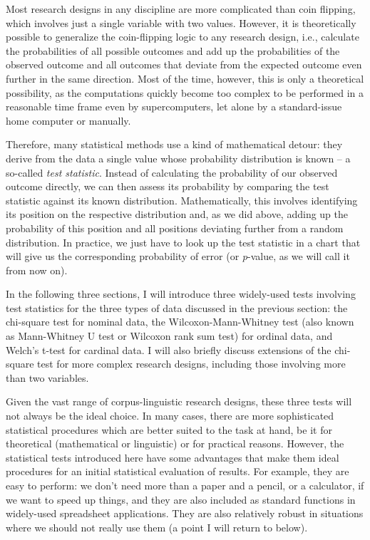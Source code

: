 Most research designs in any discipline are more complicated than coin flipping, which involves just a single variable with two values. However, it is theoretically possible to generalize the coin-flipping logic to any research design, i.e., calculate the probabilities of all possible outcomes and add up the probabilities of the observed outcome and all outcomes that deviate from the expected outcome even further in the same direction. Most of the time, however, this is only a theoretical possibility, as the computations quickly become too complex to be performed in a reasonable time frame even by supercomputers, let alone by a standard-issue home computer or manually.

Therefore, many statistical methods use a kind of mathematical detour: they derive from the data a single value whose probability distribution is known -- a so-called \textit{test statistic}. Instead of calculating the probability of our observed outcome directly, we can then assess its probability by comparing the test statistic against its known distribution. Mathematically, this involves identifying its position on the respective distribution and, as we did above, adding up the probability of this position and all positions deviating further from a random distribution. In practice, we just have to look up the test statistic in a chart that will give us the corresponding probability of error (or \textit{p}-value, as we will call it from now on).

In the following three sections, I will introduce three widely-used tests involving test statistics for the three types of data discussed in the previous section: the chi-square test for nominal data, the Wilcoxon-Mann-Whitney test (also known as Mann-Whitney U test or Wilcoxon rank sum test) for ordinal data, and Welch's t-test for cardinal data. I will also briefly discuss extensions of the chi-square test for more complex research designs, including those involving more than two variables.

Given the vast range of corpus-linguistic research designs, these three tests will not always be the ideal choice. In many cases, there are more sophisticated statistical procedures which are better suited to the task at hand, be it for theoretical (mathematical or linguistic) or for practical reasons. However, the statistical tests introduced here have some advantages that make them ideal procedures for an initial statistical evaluation of results. For example, they are easy to perform: we don't need more than a paper and a pencil, or a calculator, if we want to speed up things, and they are also included as standard functions in widely-used spreadsheet applications. They are also relatively robust in situations where we should not really use them (a point I will return to below). 

